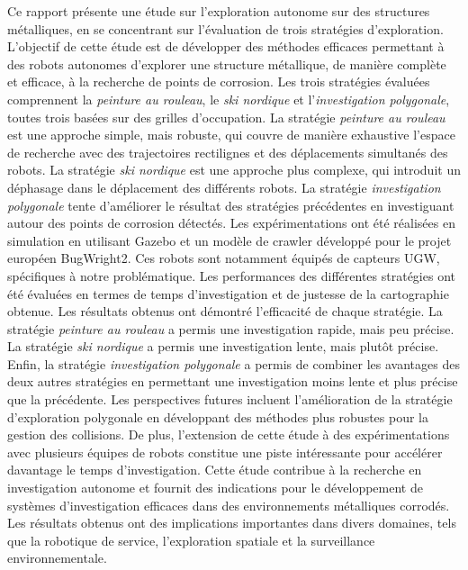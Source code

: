 \documentclass[english,RandD]{rapportPFE}  %
\begin{document}
\begin{ResumeMotsCles}
\begin{resumeEn}
{			}
		\end{resumeEn}
		\begin{resumeFr}
			{\scriptsize
				Ce rapport présente une étude sur l'exploration autonome sur des structures métalliques, en se concentrant sur l'évaluation de trois stratégies d'exploration. L'objectif de cette étude est de développer des méthodes efficaces permettant à des robots autonomes d'explorer une structure métallique, de manière complète et efficace, à la recherche de points de corrosion.
				Les trois stratégies évaluées comprennent la \textit{peinture au rouleau}, le \textit{ski nordique} et l'\textit{investigation polygonale}, toutes trois basées sur des grilles d'occupation.
				La stratégie \textit{peinture au rouleau} est une approche simple, mais robuste, qui couvre de manière exhaustive l'espace de recherche avec des trajectoires rectilignes et des déplacements simultanés des robots.
				La stratégie \textit{ski nordique} est une approche plus complexe, qui introduit un déphasage dans le déplacement des différents robots.
				La stratégie \textit{investigation polygonale} tente d'améliorer le résultat des stratégies précédentes en investiguant autour des points de corrosion détectés.
				Les expérimentations ont été réalisées en simulation en utilisant Gazebo et un modèle de crawler développé pour le projet européen BugWright2.
				Ces robots sont notamment équipés de capteurs UGW, spécifiques à notre problématique.
				Les performances des différentes stratégies ont été évaluées en termes de temps d'investigation et de justesse de la cartographie obtenue.
				Les résultats obtenus ont démontré l'efficacité de chaque stratégie.
				La stratégie \textit{peinture au rouleau} a permis une investigation rapide, mais peu précise.
				La stratégie \textit{ski nordique} a permis une investigation lente, mais plutôt précise.
				Enfin, la stratégie \textit{investigation polygonale} a permis de combiner les avantages des deux autres stratégies en permettant une investigation moins lente et plus précise que la précédente.
				Les perspectives futures incluent l'amélioration de la stratégie d'exploration polygonale en développant des méthodes plus robustes pour la gestion des collisions.
				De plus, l'extension de cette étude à des expérimentations avec plusieurs équipes de robots constitue une piste intéressante pour accélérer davantage le temps d'investigation.
				Cette étude contribue à la recherche en investigation autonome et fournit des indications pour le développement de systèmes d'investigation efficaces dans des environnements métalliques corrodés.
				Les résultats obtenus ont des implications importantes dans divers domaines, tels que la robotique de service, l'exploration spatiale et la surveillance environnementale.
			}
		\end{resumeFr}
	\end{ResumeMotsCles}
\end{document}
